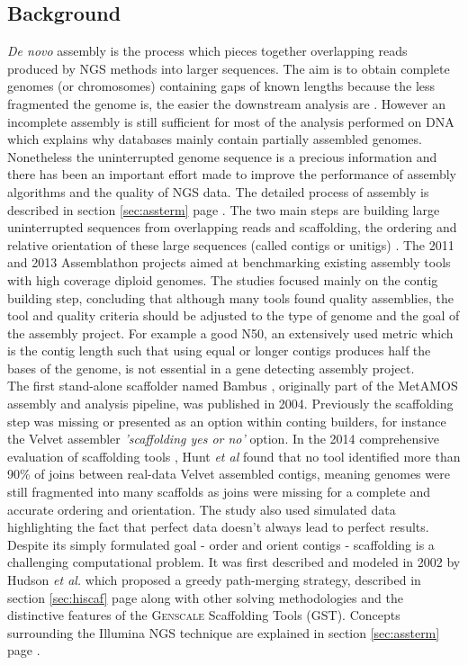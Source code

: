 \documentclass[12pt]{article}
\newcommand*{\fulleref}[1]{section \hyperref[{#1}] {\ref*{#1}} page {\pageref{#1}}}%
\begin{document}
\subsection{Background}
\textit{De novo} assembly is the process which pieces together overlapping reads produced by NGS methods into larger sequences. The aim is to obtain complete genomes (or chromosomes) containing gaps of known lengths because the less fragmented the genome is, the easier the downstream analysis are \cite{hunt_comprehensive_2014}. However an incomplete assembly is still sufficient for most of the analysis performed on DNA which explains why databases mainly contain partially assembled genomes. Nonetheless the uninterrupted genome sequence is a precious information and there has been an important effort made to improve the performance of assembly algorithms and the quality of NGS data. The detailed process of assembly is described in \fulleref{sec:assterm}. The two main steps are building large uninterrupted sequences from overlapping reads and scaffolding, the ordering and relative orientation of these large sequences (called contigs or unitigs) . The 2011 and 2013 Assemblathon projects \cite{earl_assemblathon_2011} \cite{bradnam_assemblathon_2013} aimed at  benchmarking existing assembly tools with high coverage diploid genomes. The studies focused mainly on the contig building step, concluding that although many tools found quality assemblies, the tool and quality criteria should be adjusted to the type of genome and the goal of the assembly project. For example a good N50, an extensively used metric which is the contig length such that using equal or longer contigs produces half the bases of the genome, is not essential in a gene detecting assembly project. \\
The first stand-alone scaffolder named Bambus \cite{pop_hierarchical_2004}, originally part of the MetAMOS \cite{treangen_metamos:_2013} assembly and analysis pipeline, was published in 2004. Previously the scaffolding step was missing or presented as an option within conting builders, for instance the Velvet\cite{zerbino_velvet:_2008} assembler \textit{'scaffolding yes or no'} option. In the 2014 comprehensive evaluation of scaffolding tools \cite{hunt_comprehensive_2014-1}, Hunt \textit{et al} found that no tool identified more than 90\% of joins between real-data Velvet assembled contigs, meaning genomes were still fragmented into many scaffolds as joins were missing for a complete and accurate ordering and orientation. The study also used simulated data highlighting the fact that perfect data doesn't always lead to perfect results. Despite its simply formulated goal - order and orient contigs - scaffolding is a challenging computational problem. It was first described and modeled in 2002 by Hudson \textit{et al.}\cite{huson_greedy_2002} which proposed a greedy path-merging strategy, described in \fulleref{sec:hiscaf} along with other solving methodologies and the distinctive features of the \textsc{Genscale} Scaffolding Tools (GST). Concepts surrounding the Illumina NGS technique are explained in \fulleref{sec:assterm}.
\end{document}

